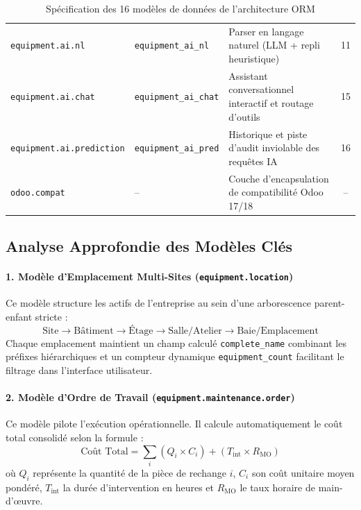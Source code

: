 \begin{table}[!ht]
\begin{tabularx}{\textwidth}{l l p{5.5cm} c}
\texttt{equipment.ai.nl} & \texttt{equipment\_ai\_nl} & Parser en langage naturel (LLM + repli heuristique) & 11 \\
\texttt{equipment.ai.chat} & \texttt{equipment\_ai\_chat} & Assistant conversationnel interactif et routage d'outils & 15 \\
\texttt{equipment.ai.prediction}& \texttt{equipment\_ai\_pred} & Historique et piste d'audit inviolable des requêtes IA & 16 \\
\texttt{odoo.compat} & -- & Couche d'encapsulation de compatibilité Odoo 17/18 & -- \\
\bottomrule
\end{tabularx}
\caption{Spécification des 16 modèles de données de l'architecture ORM}
\label{tab:models_spec}
\end{table}

\subsection{Analyse Approfondie des Modèles Clés}

\paragraph{1. Modèle d'Emplacement Multi-Sites (\texttt{equipment.location})}
Ce modèle structure les actifs de l'entreprise au sein d'une arborescence parent-enfant stricte :
\begin{equation}
\text{Site} \rightarrow \text{Bâtiment} \rightarrow \text{Étage} \rightarrow \text{Salle/Atelier} \rightarrow \text{Baie/Emplacement}
\end{equation}
Chaque emplacement maintient un champ calculé \texttt{complete\_name} combinant les préfixes hiérarchiques et un compteur dynamique \texttt{equipment\_count} facilitant le filtrage dans l'interface utilisateur.

\paragraph{2. Modèle d'Ordre de Travail (\texttt{equipment.maintenance.order})}
Ce modèle pilote l'exécution opérationnelle. Il calcule automatiquement le coût total consolidé selon la formule :
\begin{equation}
\text{Coût Total} = \sum_{i} (Q_i \times C_i) + (T_{\text{int}} \times R_{\text{MO}})
\end{equation}
où $Q_i$ représente la quantité de la pièce de rechange $i$, $C_i$ son coût unitaire moyen pondéré, $T_{\text{int}}$ la durée d'intervention en heures et $R_{\text{MO}}$ le taux horaire de main-d'œuvre.

